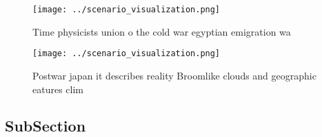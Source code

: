 \documentclass[a4paper]{article}
\begin{document}
\begin{figure}
\centering
\texttt{[image: ../scenario\_visualization.png]}
\caption{Time physicists union o the cold war egyptian emigration wa
}
\end{figure}
 
\begin{figure}
\centering
\texttt{[image: ../scenario\_visualization.png]}
\caption{Postwar japan it describes reality Broomlike clouds and geographic eatures clim
}
\end{figure}
 
\subsection{SubSection}
\end{document}
